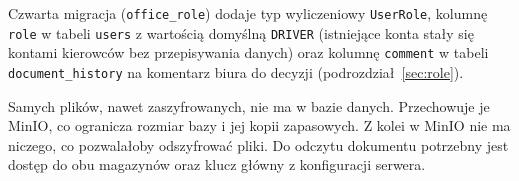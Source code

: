 Czwarta migracja (\texttt{office\_role}) dodaje typ wyliczeniowy
\texttt{UserRole}, kolumnę \texttt{role} w tabeli \texttt{users} z wartością
domyślną \texttt{DRIVER} (istniejące konta stały się kontami kierowców bez
przepisywania danych) oraz kolumnę \texttt{comment} w tabeli
\texttt{document\_history} na komentarz biura do decyzji
(podrozdział~\ref{sec:role}).

Samych plików, nawet zaszyfrowanych, nie ma w bazie danych. Przechowuje je
MinIO, co ogranicza rozmiar bazy i jej kopii zapasowych. Z kolei w MinIO nie
ma niczego, co pozwalałoby odszyfrować pliki. Do odczytu dokumentu potrzebny
jest dostęp do obu magazynów oraz klucz główny z konfiguracji serwera.
